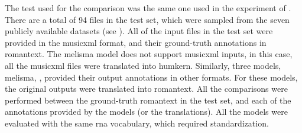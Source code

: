 
The test used for the comparison was the same one used in
the experiment of .
There are a total of 94 files in the test set, which were
sampled from the seven publicly available datasets (see
). All of the input files
in the test set were provided in the \gls{musicxml} format,
and their ground-truth annotations in \gls{romantext}. The
\gls{melisma} model does not support \gls{musicxml} inputs,
in this case, all the \gls{musicxml} files were translated
into \gls{humkern}. Similarly, three models, \gls{melisma},
\textcite{chen2021attend, mcleod2021modular}, provided their
output annotations in other formats. For these models, the
original outputs were translated into \gls{romantext}. All
the comparisons were performed between the ground-truth
\gls{romantext} in the test set, and each of the annotations
provided by the models (or the translations). All the models
were evaluated with the same \gls{rna} vocabulary, which
required standardization.
